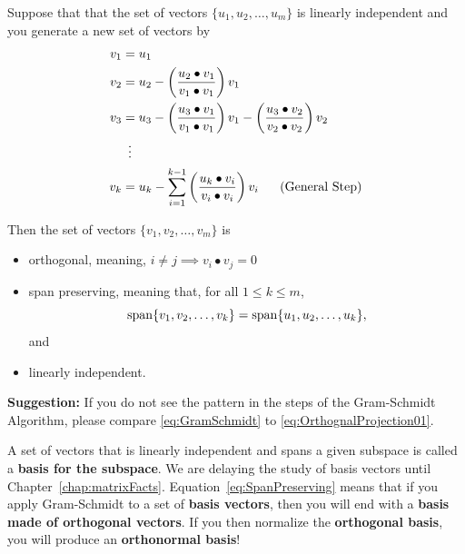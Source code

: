 \begin{tcolorbox}[sharp corners, colback=green!30, colframe=green!80!blue, title=\textbf{\Large Gram-Schmidt Process}]
Suppose that that the set of vectors $\{ u_1, u_2, \ldots, u_m\}$ is linearly independent and you generate a new set of vectors by 
 \begin{equation}
 \label{eq:GramSchmidt}
 \begin{aligned}
 v_1 & = u_1 \\
 v_2 &= u_2 - \left(\frac{u_2 \bullet v_1}{v_1 \bullet v_1}\right) v_1 \bigskip \\
 v_3 &= u_3 -\left(\frac{u_3 \bullet v_1}{v_1 \bullet v_1}\right) v_1 - \left(\frac{u_3 \bullet v_2}{v_2 \bullet v_2}\right) v_2 \\
 & ~\vdots \\
	v_k &= u_k  - \sum_{i=1}^{k-1} \left(\frac{u_k \bullet v_i}{v_i \bullet v_i}\right) v_i~~~~~\text{(General Step)}
	\end{aligned}
\end{equation}

Then the set of vectors $\{ v_1, v_2,  \ldots, v_m\}$ is 
\begin{itemize}
    \item orthogonal, meaning, $i \neq j \implies v_i \bullet v_j = 0$
    \item span preserving, meaning that, for all $1 \le k \le m$, 
    \begin{equation}
        \label{eq:SpanPreserving}
        \mathrm{span} \{ v_1, v_2, \ldots, v_k \} = \mathrm{span} \{ u_1, u_2, \ldots, u_k \},
    \end{equation} 
    and
        \item linearly independent.
\end{itemize}

\textbf{Suggestion:} If you do not see the pattern in the steps of the Gram-Schmidt Algorithm, please compare \eqref{eq:GramSchmidt} to \eqref{eq:OrthognalProjection01}.
\end{tcolorbox}

\begin{tcolorbox}[title=\textbf{Preview of Basis Vectors}]
A set of vectors that is linearly independent and spans a given subspace is called a \textbf{basis for the subspace}. We are delaying the study of basis vectors until Chapter~\ref{chap:matrixFacts}. 
Equation~\eqref{eq:SpanPreserving} means that if you apply Gram-Schmidt to a set of \textbf{basis vectors}, then you will end with a \textbf{basis made of orthogonal vectors}. If you then normalize the \textbf{orthogonal basis}, you will produce an \textbf{orthonormal basis}!
\end{tcolorbox}





